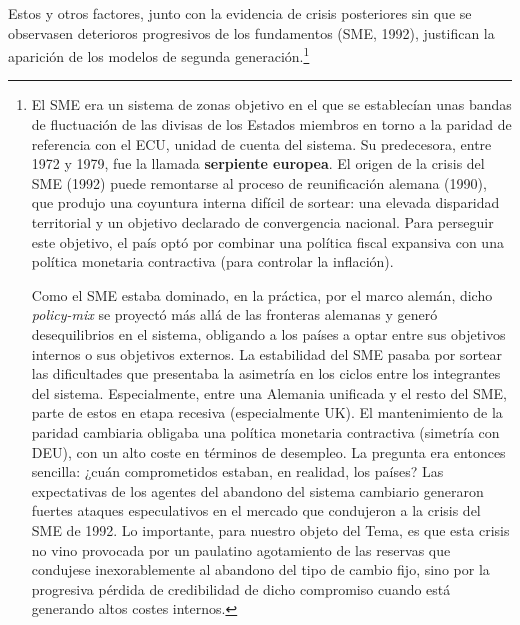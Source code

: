 \documentclass[10pt,a4paper]{article}
\begin{document}
Estos y otros factores, junto con la evidencia de crisis posteriores sin que se observasen deterioros progresivos de los fundamentos (SME, 1992), justifican la aparición de los modelos de segunda generación.\footnote{%
    El SME era un sistema de zonas objetivo en el que se establecían unas bandas de fluctuación de las divisas de los Estados miembros en torno a la paridad de referencia con el ECU, unidad de cuenta del sistema. Su predecesora, entre 1972 y 1979, fue la llamada \textbf{serpiente europea}. El origen de la crisis del SME (1992) puede remontarse al proceso de reunificación alemana (1990), que produjo una coyuntura interna difícil de sortear: una elevada disparidad territorial y un objetivo declarado de convergencia nacional. Para perseguir este objetivo, el país optó por combinar una política fiscal expansiva con una política monetaria contractiva (para controlar la inflación). 

Como el SME estaba dominado, en la práctica, por el marco alemán, dicho \textit{policy-mix} se proyectó más allá de las fronteras alemanas y generó desequilibrios en el sistema, obligando a los países a optar entre sus objetivos internos o sus objetivos externos. La estabilidad del SME pasaba por sortear las dificultades que presentaba la asimetría en los ciclos entre los integrantes del sistema. Especialmente, entre una Alemania unificada y el resto del SME, parte de estos en etapa recesiva (especialmente UK). El mantenimiento de la paridad cambiaria obligaba una política monetaria contractiva (simetría con DEU), con un alto coste en términos de desempleo. La pregunta era entonces sencilla: ¿cuán comprometidos estaban, en realidad, los países? Las expectativas de los agentes del abandono del sistema cambiario generaron fuertes ataques especulativos en el mercado que condujeron a la crisis del SME de 1992. Lo importante, para nuestro objeto del Tema, es que esta crisis no vino provocada por un paulatino agotamiento de las reservas que condujese inexorablemente al abandono del tipo de cambio fijo, sino por la progresiva pérdida de credibilidad de dicho compromiso cuando está generando altos costes internos.
}
\end{document}
